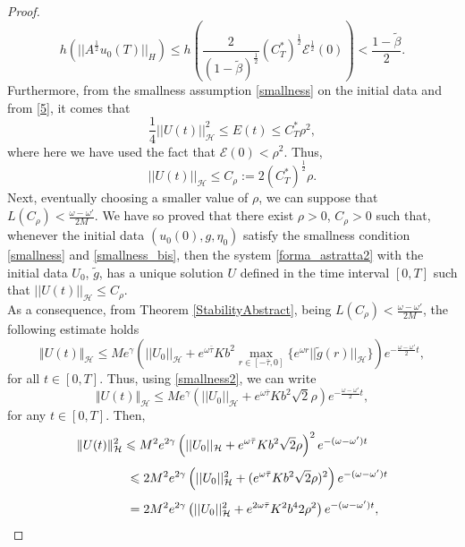 \documentclass[11pt]{article}
\renewcommand{\leq}{\leqslant}
\renewcommand{\le}{\leqslant}
\begin{document}
\begin{proof}
\begin{equation}
	h(||A^{\frac{1}{2}}u_0(T)||_{H})\leq h\left(\frac{2}{(1-\tilde{\beta})^{\frac{1}{2}}}(C_T^*)^{\frac{1}{2}}\mathcal{E}^{\frac{1}{2}}(0)\right)<\frac{1-\tilde{\beta}}{2}.
\end{equation}
Furthermore, from the smallness assumption \eqref{smallness} on the initial data and from \eqref{5}, it comes that
$$\frac{1}{4}||U(t)||^2_{\mathcal H}\leq E(t)\leq C_T^*\rho^2,$$
where here we have used the fact that ${\mathcal E}(0)<\rho^2$. Thus, 
\begin{equation}\label{boundedU}
	||U(t)||_{\mathcal H} \leq C_{\rho}:=2(C_T^*)^{\frac{1}{2}}\rho.
\end{equation}
Next, eventually choosing a smaller value of $\rho$, we can suppose that $L(C_\rho)<\frac{\omega-\omega'}{2M}$. We have so proved that there exist $\rho>0$, $C_\rho>0$ such that, whenever the initial data $(u_0(0),g,\eta_0)$ satisfy the smallness condition \eqref{smallness} and \eqref{smallness_bis}, then the system \eqref{forma_astratta2} with the initial data $U_0$, $\tilde{g}$, has a unique solution $U$ defined in the time interval $[0,T]$ such that $||U(t)||_{\mathcal H} \leq C_{\rho}$. 
\\As a consequence, from Theorem \ref{StabilityAbstract}, being $L(C_{\rho})<\frac{\omega-\omega'}{2M}$, the following estimate holds
$$\Vert  U(t)\Vert_{\mathcal H}\le Me^{\gamma}\left(||U_0||_{\mathcal H}+e^{\omega\bar{\tau}}Kb^2\max_{r\in[-\bar{\tau},0]}\{e^{\omega r}||\tilde{g}(r)||_{\mathcal H}\}\right)e^{-\frac{\omega-\omega'}{2}t},$$
for all $t\in [0,T]$. Thus, using \eqref{smallness2}, we can write
$$\Vert  U(t)\Vert_{\mathcal H}\le Me^{\gamma}\left(||U_0||_{\mathcal H}+e^{\omega\bar{\tau}}Kb^2 \sqrt{2} \rho\right)e^{-\frac{\omega-\omega'}{2}t},$$
for any $t\in [0,T]$. Then, 
$$\begin{array}{l}
	\vspace{0.3cm}\displaystyle{\Vert  U(t)\Vert^2_{\mathcal H}\le M^2e^{2\gamma}\left(||U_0||_{\mathcal H}+e^{\omega\bar{\tau}}Kb^2 \sqrt{2} \rho\right)^2e^{-(\omega-\omega')t}}\\
	\vspace{0.3cm}\displaystyle{\hspace{1.5cm}\leq2M^2e^{2\gamma}\left(||U_0||^2_{\mathcal H}+(e^{\omega\bar{\tau}}Kb^2 \sqrt{2} \rho )^2\right)e^{-(\omega-\omega')t}}\\
	\displaystyle{\hspace{1.5cm}=2M^2e^{2\gamma}\left(||U_0||^2_{\mathcal H}+e^{2\omega\bar{\tau}}K^2b^4 2\rho^2\right)e^{-(\omega-\omega')t},}
\end{array}$$

\end{proof}
\end{document}
